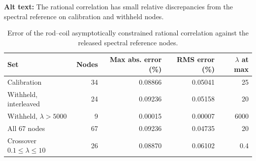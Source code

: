 \begin{table}[ht]
\centering
\caption{Error of the rod--coil asymptotically constrained rational correlation against the released spectral reference nodes.}
\par\raggedright\textbf{Alt text:} The rational correlation has small relative discrepancies from the spectral reference on calibration and withheld nodes.\par\centering

\label{tab:fit_metrics}
\begin{tabular}{lrrrr}
\toprule
Set & Nodes & Max abs. error (\%) & RMS error (\%) & $\lambda$ at max\\
\midrule
Calibration & 34 & 0.08866 & 0.05041 & 25\\
Withheld, interleaved & 24 & 0.09236 & 0.05158 & 20\\
Withheld, $\lambda>5000$ & 9 & 0.00015 & 0.00007 & 6000\\
All 67 nodes & 67 & 0.09236 & 0.04735 & 20\\
Crossover $0.1\le\lambda\le10$ & 26 & 0.08870 & 0.06102 & 0.4\\
\bottomrule
\end{tabular}
\end{table}
